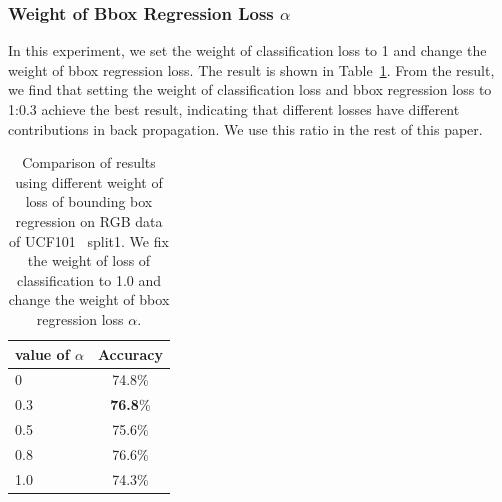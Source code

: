 \documentclass[10pt,twocolumn,letterpaper]{article}
\begin{document}
\subsubsection{Weight of Bbox Regression Loss $\alpha$}
In this experiment, we set the weight of classification loss to 1 and change the weight of bbox regression loss. The result is shown in Table~\ref{table:alpha}. From the result, we find that setting the weight of classification loss and bbox regression loss to 1:0.3 achieve the best result, indicating that different losses have different contributions in back propagation. We use this ratio in the rest of this paper.
\begin{table}
	\begin{center}
		\begin{tabular}{|l|c|}
			\hline
			value of $\alpha$ & Accuracy\\
			\hline												
			0										& 74.8\% \\
			0.3										& \textbf{76.8}\% \\
			0.5										& 75.6\% \\
			0.8										& 76.6\% \\
			1.0										& 74.3\% \\
			\hline
		\end{tabular}
	\end{center}
	\caption{Comparison of results using different weight of loss of bounding box regression on RGB data of UCF101~\cite{soomro2012ucf101} split1. We fix the weight of loss of classification to 1.0 and change the weight of bbox regression loss $\alpha$. }
	\label{table:alpha}
\end{table}
\end{document}
